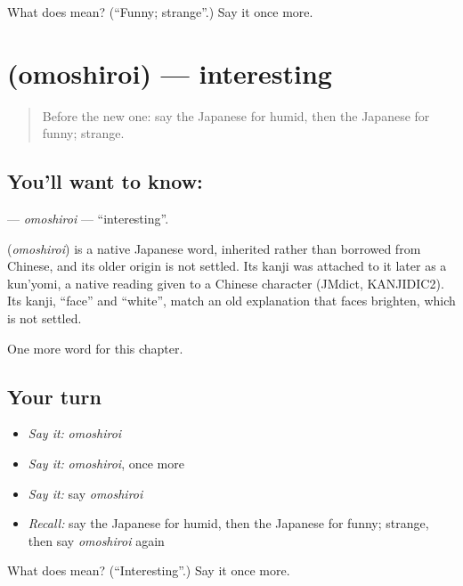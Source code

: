 \begin{tcolorbox}[breakable,colback=teal!4,colframe=teal!35!black,title={Before you move on}]
What does  mean? (\textquotedblleft{}Funny; strange\textquotedblright{}.) Say it once more.
\end{tcolorbox}
\section[\texorpdfstring{\ja{おもしろい} (omoshiroi)}{おもしろい (omoshiroi)}]{ (omoshiroi) — interesting}

\label{lesson:JA-C124-omoshiroi}



\begin{quote}
Before the new one: say the Japanese for humid, then the Japanese for funny; strange.
\end{quote}

\subsection*{You'll want to know: }
\textbf{} — \emph{omoshiroi} — \textquotedblleft{}interesting\textquotedblright{}.

\begin{cousinweb}
\textbf{} (\emph{omoshiroi}) is a native Japanese word, inherited rather than borrowed from Chinese, and its older origin is not settled. Its kanji was attached to it later as a kun'yomi, a native reading given to a Chinese character (JMdict, KANJIDIC2). Its kanji, \textquotedblleft{}face\textquotedblright{} and \textquotedblleft{}white\textquotedblright{}, match an old explanation that faces brighten, which is not settled.
\end{cousinweb}

\begin{grammarlens}[title={What you've built}]
One more word for this chapter.
\end{grammarlens}

\subsection*{Your turn}
\begin{itemize}
\raggedright
  \item \emph{Say it:} \emph{omoshiroi}
  \item \emph{Say it:} \emph{omoshiroi}, once more
  \item \emph{Say it:} say \emph{omoshiroi}
  \item \emph{Recall:} say the Japanese for humid, then the Japanese for funny; strange, then say \emph{omoshiroi} again
\end{itemize}

\begin{tcolorbox}[breakable,colback=teal!4,colframe=teal!35!black,title={Before you move on}]
What does  mean? (\textquotedblleft{}Interesting\textquotedblright{}.) Say it once more.
\end{tcolorbox}
